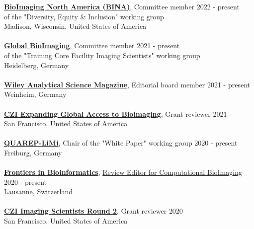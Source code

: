\documentclass[margin,line]{res}
\begin{document}
\begin{resume}
{\bf \href{https://www.bioimagingna.org/}{BioImaging North America (BINA)}}, Committee member \hfill {2022 - present}\\
of the "Diversity, Equity \& Inclusion" working group\\
Madison, Wisconsin, United States of America\\
\vspace*{-3mm}\\
{\bf \href{https://globalbioimaging.org/working-groups}{Global BioImaging}}, Committee member \hfill {2021 - present}\\
of the "Training Core Facility Imaging Scientists" working group\\
Heidelberg, Germany\\
\vspace*{-3mm}\\
{\bf \href{https://analyticalscience.wiley.com/}{Wiley Analytical Science Magazine}}, Editorial board member  \hfill {2021 - present}\\
Weinheim, Germany \\
\vspace*{-3mm}\\
{\bf \href{https://chanzuckerberg.com/rfa/expanding-global-access-bioimaging/}{CZI Expanding Global Access to Bioimaging}}, Grant reviewer \hfill {2021}\\
San Francisco, United States of America\\
\vspace*{-3mm}\\
{\bf \href{https://quarep.org/}{QUAREP-LiMi}}, Chair of the "White Paper" working group \hfill {2020 - present}\\
Freiburg, Germany\\
\vspace*{-3mm}\\
{\bf  \href{https://www.frontiersin.org/journals/bioinformatics/sections/computational-bioimaging}{ Frontiers in Bioinformatics}},  \href{https://www.frontiersin.org/journals/bioinformatics/sections/computational-bioimaging}{Review Editor for Computational BioImaging} \hfill {2020 - present}\\
Lausanne, Switzerland\\
\vspace*{-3mm}\\
{\bf \href{https://chanzuckerberg.com/rfa/chan-zuckerberg-initiative-imaging-scientists/}{CZI Imaging Scientists Round 2}}, Grant reviewer \hfill {2020}\\
San Francisco, United States of America\\

\end{resume}
\end{document}
